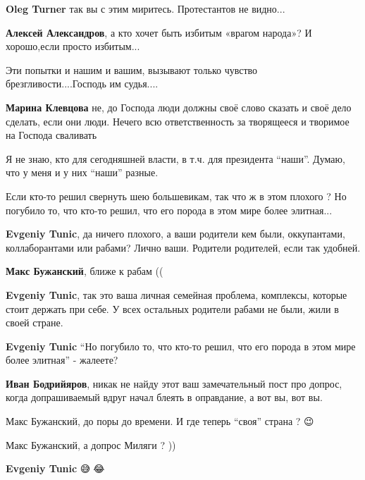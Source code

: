 \begin{itemize}
\textbf{Oleg Turner} так вы с этим миритесь. Протестантов не видно...

\textbf{Алексей Александров}, а кто хочет быть избитым «врагом народа»? И хорошо,если просто избитым...

Эти попытки и нашим и вашим, вызывают только чувство брезгливости....Господь им судья....


\textbf{Марина Клевцова} не, до Господа люди должны своё слово сказать и своё дело
сделать, если они люди. Нечего всю ответственность за творящееся и творимое на
Господа сваливать

Я не знаю, кто для сегодняшней власти, в т.ч. для президента \enquote{наши}. Думаю, что у меня и у них \enquote{наши} разные.


Если кто-то решил свернуть шею большевикам, так что ж в этом плохого ? Но
погубило то, что кто-то решил, что его порода в этом мире более элитная...

\begin{itemize}

\textbf{Evgeniy Tunic}, да ничего плохого, а ваши родители кем были,
оккупантами, коллаборантами или рабами? Лично ваши. Родители родителей, если
так удобней.

\textbf{Макс Бужанский}, ближе к рабам ((

\textbf{Evgeniy Tunic}, так это ваша личная семейная проблема, комплексы, которые стоит держать при себе.
У всех остальных родители рабами не были, жили в своей стране.

\textbf{Evgeniy Tunic} \enquote{Но погубило то, что кто-то решил, что его порода в этом мире более элитная} - жалеете?

\textbf{Иван Бодрийяров}, никак не найду этот ваш замечательный пост про допрос, когда
допрашиваемый вдруг начал блеять в оправдание, а вот вы, вот вы.


Макс Бужанский, до поры до времени. И где теперь \enquote{своя} страна ? 😉

Макс Бужанский, а допрос Миляги ? ))

\textbf{Evgeniy Tunic} 😅🤣😂


\end{itemize}
\end{itemize}
